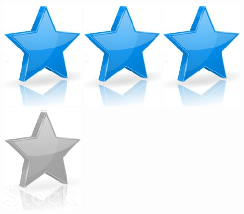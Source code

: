 \documentclass[10pt,a4paper,sans]{article}
\begin{document}
\begin{minipage}[t]{0.28\textwidth}
\begin{mdframed}[style=cadreCompetences]
\begin{itemize}
{                    \includegraphics[scale=0.20]{img/star.png} \hspace{-0.2cm}
                    \includegraphics[scale=0.20]{img/star.png} \hspace{-0.2cm}
                    \includegraphics[scale=0.20]{img/star.png} \hspace{-0.2cm}
                    \includegraphics[scale=0.20]{img/empty_star.png}}

\end{itemize}
\end{mdframed}
\end{minipage}
\end{document}
